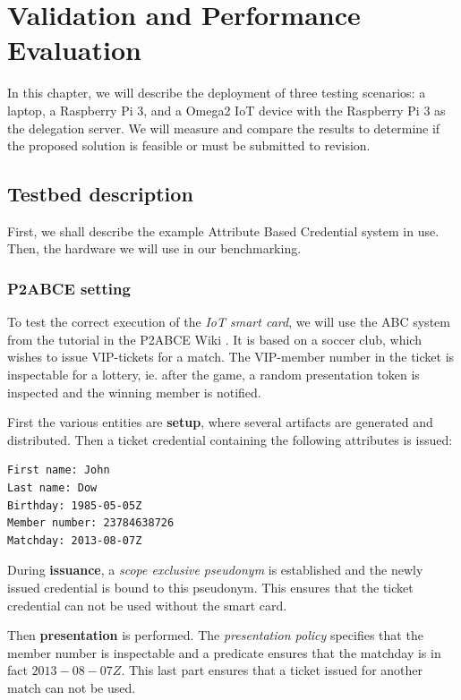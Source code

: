 \chapter{Validation and Performance Evaluation}\label{ch:validation}

In this chapter, we will describe the deployment of three testing scenarios: a laptop, a Raspberry Pi 3, and a Omega2 IoT device with the Raspberry Pi 3 as the delegation server. We will measure and compare the results to determine if the proposed solution is feasible or must be submitted to revision.

\section{Testbed description}

First, we shall describe the example Attribute Based Credential system in use. Then, the hardware we will use in our benchmarking.

\subsection{P2ABCE setting}

To test the correct execution of the \textit{IoT smart card}, we will use the ABC system from the tutorial in the P2ABCE Wiki \citep{p2abcurlwiki}. It is based on a soccer club, which wishes to issue VIP-tickets for a match. The VIP-member number in the ticket is inspectable for a lottery, ie. after the game, a random presentation token is inspected and the winning member is notified.

First the various entities are \textbf{setup}, where several artifacts are generated and distributed. Then a ticket credential containing the following attributes is issued:

\begin{verbatim}
First name: John
Last name: Dow
Birthday: 1985-05-05Z
Member number: 23784638726
Matchday: 2013-08-07Z
\end{verbatim}

During \textbf{issuance}, a \textit{scope exclusive pseudonym} is established and the newly issued credential is bound to this pseudonym. This ensures that the ticket credential can not be used without the smart card.

Then \textbf{presentation} is performed. The \textit{presentation policy} specifies that the member number is inspectable and a predicate ensures that the matchday is in fact $2013-08-07Z$. This last part ensures that a ticket issued for another match can not be used.

